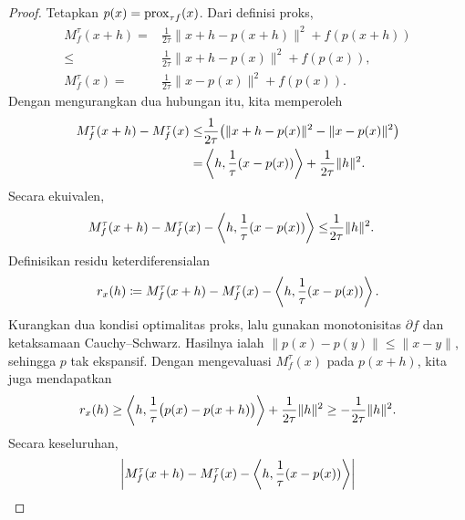\begin{proof}
    Tetapkan \(p(x)=\mathrm{prox}_{\tau f}(x)\). Dari definisi proks,
    \begin{equation}
        \begin{aligned}
            M_f^\tau(x+h)
            =&\frac{1}{2\tau}\|x+h-p(x+h)\|^2+f(p(x+h))\\
            \leq&\frac{1}{2\tau}\|x+h-p(x)\|^2+f(p(x)),\\
            M_f^\tau(x)
            =&\frac{1}{2\tau}\|x-p(x)\|^2+f(p(x)).
        \end{aligned}
    \end{equation}
    Dengan mengurangkan dua hubungan itu, kita memperoleh
    \begin{equation}
        \begin{aligned}
            M_f^\tau(x+h)-M_f^\tau(x)
            \leq&\frac{1}{2\tau}\bigl(\|x+h-p(x)\|^2-\|x-p(x)\|^2\bigr)\\
            =&\left\langle h , \frac{1}{\tau}(x-p(x))\right\rangle
              +\frac{1}{2\tau}\|h\|^2.
        \end{aligned}
    \end{equation}
    Secara ekuivalen,
    \begin{equation}
        \begin{aligned}
            M_f^\tau(x+h)-M_f^\tau(x)
            -\left\langle h , \frac{1}{\tau}(x-p(x))\right\rangle
            \leq&\frac{1}{2\tau}\|h\|^2.
        \end{aligned}
    \end{equation}
    Definisikan residu keterdiferensialan
    \begin{equation}\label{proximal:eq:moreau_diff}
        r_x(h)\coloneqq
        M_f^\tau(x+h)-M_f^\tau(x)
        -\left\langle h , \frac{1}{\tau}(x-p(x))\right\rangle.
    \end{equation}
    Kurangkan dua kondisi optimalitas proks, lalu gunakan monotonisitas \(\partial f\) dan ketaksamaan Cauchy--Schwarz. Hasilnya ialah \(\|p(x)-p(y)\|\leq\|x-y\|\), sehingga \(p\) tak ekspansif. Dengan mengevaluasi \(M_f^\tau(x)\) pada \(p(x+h)\), kita juga mendapatkan
    \begin{equation}
        r_x(h)
        \geq\left\langle h , \frac{1}{\tau}\bigl(p(x)-p(x+h)\bigr)\right\rangle
             +\frac{1}{2\tau}\|h\|^2
        \geq-\frac{1}{2\tau}\|h\|^2.
    \end{equation}
    Secara keseluruhan,
    \begin{equation}
        \begin{aligned}
            \left|M_f^\tau(x+h)-M_f^\tau(x)
            -\inner{h}{\frac{1}{\tau}(x-p(x))}\right|

\end{aligned}
\end{equation}
\end{proof}

